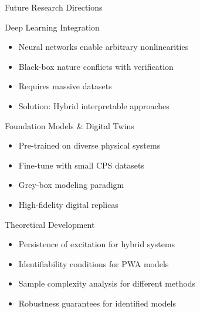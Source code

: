 \documentclass[aspectratio=169]{beamer}
\begin{document}
\begin{frame}{Future Research Directions}
\begin{block}{Deep Learning Integration}
\begin{itemize}
\item Neural networks enable arbitrary nonlinearities
\item Black-box nature conflicts with verification
\item Requires massive datasets
\item Solution: Hybrid interpretable approaches
\end{itemize}
\end{block}

\begin{block}{Foundation Models \& Digital Twins}
\begin{itemize}
\item Pre-trained on diverse physical systems
\item Fine-tune with small CPS datasets
\item Grey-box modeling paradigm
\item High-fidelity digital replicas
\end{itemize}
\end{block}

\begin{block}{Theoretical Development}
\begin{itemize}
\item Persistence of excitation for hybrid systems
\item Identifiability conditions for PWA models
\item Sample complexity analysis for different methods
\item Robustness guarantees for identified models
\end{itemize}
\end{block}
\end{frame}
\end{document}
